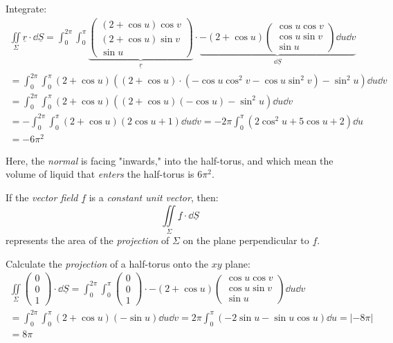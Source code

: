 \documentclass[00_complete]{sub files}
\begin{document}
\begin{example}
    Integrate:
    \begin{gather*}
    \iint\limits_\Sigma \underline r \cdot \dd{\underline
    S}=\int_{0}^{2\pi}\int_{0}^{\pi}
    \underbrace{
    \begin{pmatrix}
        (2+\cos u) \cos v \\ (2+\cos u) \sin v \\ \sin u
    \end{pmatrix}}_{\underline r} \cdot \underbrace{-(2+\cos u)\begin{pmatrix}
        \cos u \cos v \\ \cos u \sin v \\ \sin u
    \end{pmatrix} \dd{u}\dd{v}}_{\dd{\underline S}} \\
    =\int_{0}^{2\pi}\int_{0}^{\pi}(2+\cos u)((2+\cos u)\cdot (-\cos u
    \cos^2v-\cos u \sin^2 v)-\sin^2 u) \dd{u}\dd{v} \\
    =\int_{0}^{2\pi}\int_{0}^{\pi}(2+\cos u)((2+\cos u)(-\cos u)-\sin^2
    u)\dd{u} \dd{v} \\
    =-\int_{0}^{2\pi}\int_{0}^{\pi}(2+\cos u)(2\cos u +1)
    \dd{u}\dd{v}=-2\pi\int_{0}^{\pi}(2\cos^2u +5\cos u + 2)\dd{u} \\
    =-6\pi^2
    \end{gather*}
\begin{note}
    Here, the \emph{normal} is facing "inwards," into the
    half-torus, and which mean the volume of liquid that
    \emph{enters} the half-torus is $6\pi^2$.
\end{note}
\end{example}
\begin{note}
    If the \emph{vector field} $\underline f$ is a \emph{constant unit vector},
    then:
    $$\iint\limits_\Sigma \underline f \cdot \dd{\underline S}$$
    represents the area of the \emph{projection} of $\Sigma$ on the plane
    perpendicular to $\underline f$.
\end{note}
\begin{example}
    Calculate the \emph{projection} of a half-torus onto the $xy$ plane:
    \begin{gather*}
    \iint\limits_\Sigma\begin{pmatrix}
        0 \\ 0 \\ 1
    \end{pmatrix} \cdot \dd{\underline S} = \int_{0}^{2\pi}\int_{0}^{\pi} \begin{pmatrix}
        0 \\ 0 \\ 1
    \end{pmatrix} \cdot -(2+\cos u)\begin{pmatrix}
        \cos u \cos v \\ \cos u \sin v \\ \sin u
    \end{pmatrix} \dd{u}\dd{v} \\
    =\int_{0}^{2\pi}\int_{0}^{\pi}(2+\cos u)(-\sin u)\dd{u}\dd{v} =
    2\pi\int_{0}^{\pi} (-2\sin u -\sin u \cos u)\dd{u} = |-8\pi| \\=8\pi
    \end{gather*}
\end{example}
\end{document}
